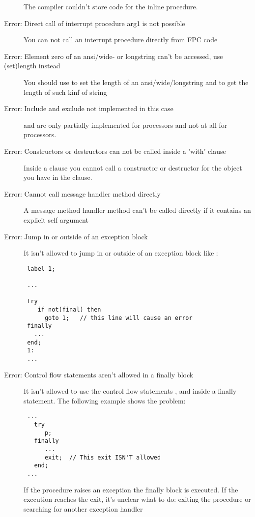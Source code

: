\begin{description}
 The compiler couldn't store code for the inline procedure.
\item [Error: Direct call of interrupt procedure arg1 is not possible]
 You can not call an interrupt procedure directly from FPC code
\item [Error: Element zero of an ansi/wide- or longstring can't be accessed, use (set)length instead]
 You should use  to set the length of an ansi/wide/longstring
 and  to get the length of such kinf of string
\item [Error: Include and exclude not implemented in this case]
  and  are only partially
 implemented for  processors
 and not at all for  processors.
\item [Error: Constructors or destructors can not be called inside a 'with' clause]
 Inside a  clause you cannot call a constructor or destructor for the
 object you have in the  clause.
\item [Error: Cannot call message handler method directly]
 A message method handler method can't be called directly if it contains an
 explicit self argument
\item [Error: Jump in or outside of an exception block]
 It isn't allowed to jump in or outside of an exception block like :
 \begin{verbatim}
 label 1;

 ...

 try
    if not(final) then
      goto 1;   // this line will cause an error
 finally
   ...
 end;
 1:
 ...
 \end{verbatim}
\item [Error: Control flow statements aren't allowed in a finally block]
 It isn't allowed to use the control flow statements ,
  and 
 inside a finally statement. The following example shows the problem:
 \begin{verbatim}
 ...
   try
      p;
   finally
      ...
      exit;  // This exit ISN'T allowed
   end;
 ...

 \end{verbatim}
 If the procedure  raises an exception the finally block is
 executed. If the execution reaches the exit, it's unclear what to do:
 exiting the procedure or searching for another exception handler
 \end{description}

